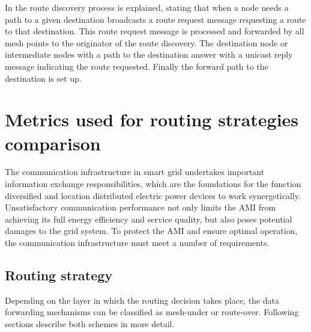 \documentclass[11pt,draftclsnofoot,onecolumn]{IEEEtran}
\begin{document}
In \cite{Bahr2006} the route discovery process is explained, stating that when a node needs a path to a given destination broadcasts a route request message requesting a route to that destination. This route request message is processed and forwarded by all mesh points to the originator of the route discovery. The destination node or intermediate nodes with a path to the destination answer with a unicast reply message indicating the route requested. Finally the forward path to the destination is set up. 


\section{Metrics used for routing strategies comparison}\label{metrics}

The communication infrastructure in smart grid undertakes important information exchange responsibilities, which are the foundations for the function diversified and location distributed electric power devices to work synergetically. Unsatisfactory communication performance not only limits the AMI from achieving its full energy efficiency and service quality, but also poses potential damages to the grid system. To protect the AMI and ensure optimal operation, the communication infrastructure must meet a number of requirements.

\subsection{Routing strategy}
Depending on the layer in which the routing decision takes place, the data forwarding mechanisms can be classified as mesh-under or route-over. Following sections describe both schemes in more detail.
\end{document}
